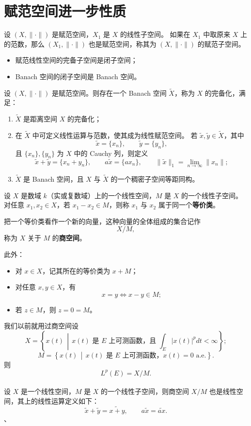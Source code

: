 \section{赋范空间进一步性质}
\begin{definition}[赋范空间的子空间]
设 $(X,\|\cdot\|)$ 是赋范空间，$X_1$ 是 $X$ 的线性子空间。  
如果在 $X_1$ 中取原来 $X$ 上的范数，那么 $(X_1,\|\cdot\|)$ 也是赋范空间，称其为 $(X,\|\cdot\|)$ 的赋范子空间。

\begin{itemize}
  \item 赋范线性空间的完备子空间是闭子空间；
  \item Banach 空间的闭子空间是 Banach 空间。
\end{itemize}
\end{definition}
\begin{theorem}[赋范空间的完备化]
设 \((X,\|\cdot\|)\) 是赋范空间。则存在一个 Banach 空间 \(\widetilde{X}\)，称为 \(X\) 的完备化，满足：

\begin{enumerate}
  \item \(\widetilde{X}\) 是距离空间 \(X\) 的完备化；
  \item 在 \(\widetilde{X}\) 中可定义线性运算与范数，使其成为线性赋范空间。  
  若 \(\tilde{x},\tilde{y}\in\widetilde{X}\)，其中
  \[
  \tilde{x}=\{x_n\},\qquad \tilde{y}=\{y_n\},
  \]
  且 \(\{x_n\},\{y_n\}\) 为 \(X\) 中的 Cauchy 列，则定义
  \[
  \tilde{x}+\tilde{y}=\{x_n+y_n\},\qquad
  a\tilde{x}=\{a x_n\},\qquad
  \|\tilde{x}\|_1=\lim_{n\to\infty}\|x_n\|;
  \]
  \item \(\widetilde{X}\) 是 Banach 空间，且 \(X\) 与 \(\widetilde{X}\) 的一个稠密子空间等距同构。
\end{enumerate}
\end{theorem}
\begin{definition}[商空间]
设 \(X\) 是数域 \(k\)（实或复数域）上的一个线性空间，\(M\) 是 \(X\) 的一个线性子空间。  
对任意 \(x_1,x_2\in X\)，若 \(x_1 - x_2 \in M\)，则称 \(x_1\) 与 \(x_2\) 属于同一个\textbf{等价类}。

把一个等价类看作一个新的向量，这种向量的全体组成的集合记作
\[
X/M,
\]
称为 \(X\) 关于 \(M\) 的\textbf{商空间}。


\end{definition}
此外：
\begin{itemize}
  \item 对 \(x\in X\)，记其所在的等价类为 \(x+M\)；
  \item 对任意 \(x,y\in X\)，有
  \[
  x=y \iff x-y\in M;
  \]
  \item 若 \(z\in M\)，则 \(z=0=M\)。
\end{itemize}
我们以前就用过商空间设
\[
X=\left\{x(t)\,\middle|\,x(t)\text{ 是 }E\text{ 上可测函数，且 }\int_E|x(t)|^pdt<\infty\right\};
\]
\[
M=\left\{x(t)\,\middle|\,x(t)\text{ 是 }E\text{ 上可测函数，}x(t)=0\text{ a.e.}\right\}.
\]
则
\[
L^p(E)=X/M.
\]
\\
设 \(X\) 是一个线性空间，\(M\) 是 \(X\) 的一个线性子空间，则商空间 \(X/M\) 也是线性空间，其上的线性运算定义如下：
\[
\tilde{x}+\tilde{y}=\widetilde{x+y},\qquad a\tilde{x}=\widetilde{a x}.
\]
、

